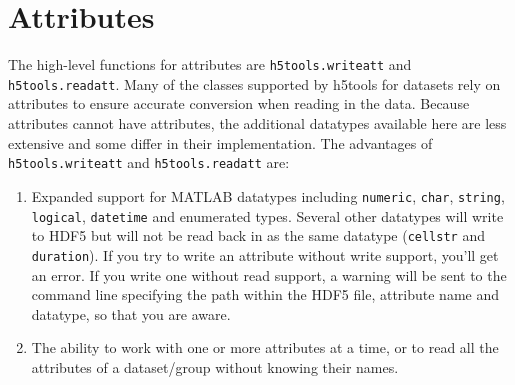 \documentclass[11pt]{exam}
\newcommand\myfcn[1]{\colorbox{codegray}{\textcolor{codeblue}{\texttt{#1}}}}
\begin{document}
                                              
                                      
    \section{Attributes}
        \noindent The high-level functions for attributes are \myfcn{h5tools.writeatt} and \myfcn{h5tools.readatt}. Many of the classes supported by h5tools for datasets rely on attributes to ensure accurate conversion when reading in the data. Because attributes cannot have attributes, the additional datatypes available here are less extensive and some differ in their implementation. The advantages of \myfcn{h5tools.writeatt} and \myfcn{h5tools.readatt} are: 
		\begin{enumerate}
			\item Expanded support for MATLAB datatypes including \texttt{numeric}, \texttt{char}, \texttt{string}, \texttt{logical}, \texttt{datetime} and enumerated types. Several other datatypes will write to HDF5 but will not be read back in as the same datatype (\texttt{cellstr} and \texttt{duration}). If you try to write an attribute without write support, you'll get an error. If you write one without read support, a warning will be sent to the command line specifying the path within the HDF5 file, attribute name and datatype, so that you are aware. 
			\item The ability to work with one or more attributes at a time, or to read all the attributes of a dataset/group without knowing their names.
		\end{enumerate}
\end{document}
